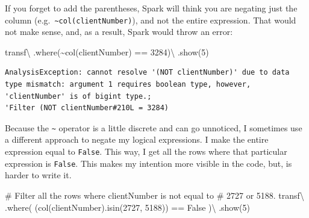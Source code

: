 \documentclass[
  11pt,
  letterpaper,
  DIV=11,
  numbers=noendperiod]{scrreprt}
\newenvironment{Shaded}{\begin{snugshade}}{\end{snugshade}}
\newcommand{\CommentTok}[1]{\textcolor[rgb]{0.37,0.37,0.37}{#1}}
\newcommand{\DecValTok}[1]{\textcolor[rgb]{0.68,0.00,0.00}{#1}}
\newcommand{\NormalTok}[1]{\textcolor[rgb]{0.00,0.23,0.31}{#1}}
\newcommand{\OperatorTok}[1]{\textcolor[rgb]{0.37,0.37,0.37}{#1}}
\newcommand{\StringTok}[1]{\textcolor[rgb]{0.13,0.47,0.30}{#1}}
\newcommand{\VariableTok}[1]{\textcolor[rgb]{0.07,0.07,0.07}{#1}}
\begin{document}
If you forget to add the parentheses, Spark will think you are negating
just the column
(e.g.~\texttt{\textasciitilde{}col(\textquotesingle{}clientNumber\textquotesingle{})}),
and not the entire expression. That would not make sense, and, as a
result, Spark would throw an error:

\begin{Shaded}
\begin{Highlighting}[]
\NormalTok{transf}\OperatorTok{\textbackslash{}}
\NormalTok{  .where(}\OperatorTok{\textasciitilde{}}\NormalTok{col(}\StringTok{\textquotesingle{}clientNumber\textquotesingle{}}\NormalTok{) }\OperatorTok{==} \DecValTok{3284}\NormalTok{)}\OperatorTok{\textbackslash{}}
\NormalTok{  .show(}\DecValTok{5}\NormalTok{)}
\end{Highlighting}
\end{Shaded}

\begin{verbatim}
AnalysisException: cannot resolve '(NOT clientNumber)' due to data type mismatch: argument 1 requires boolean type, however, 'clientNumber' is of bigint type.;
'Filter (NOT clientNumber#210L = 3284)
\end{verbatim}

Because the \texttt{\textasciitilde{}} operator is a little discrete and
can go unnoticed, I sometimes use a different approach to negate my
logical expressions. I make the entire expression equal to
\texttt{False}. This way, I get all the rows where that particular
expression is \texttt{False}. This makes my intention more visible in
the code, but, is harder to write it.

\begin{Shaded}
\begin{Highlighting}[]
\CommentTok{\# Filter all the rows where \textasciigrave{}clientNumber\textasciigrave{} is not equal to}
\CommentTok{\# 2727 or 5188.}
\NormalTok{transf}\OperatorTok{\textbackslash{}}
\NormalTok{  .where( (col(}\StringTok{\textquotesingle{}clientNumber\textquotesingle{}}\NormalTok{).isin(}\DecValTok{2727}\NormalTok{, }\DecValTok{5188}\NormalTok{)) }\OperatorTok{==} \VariableTok{False}\NormalTok{ )}\OperatorTok{\textbackslash{}}
\NormalTok{  .show(}\DecValTok{5}\NormalTok{)}
\end{Highlighting}
\end{Shaded}
\end{document}
